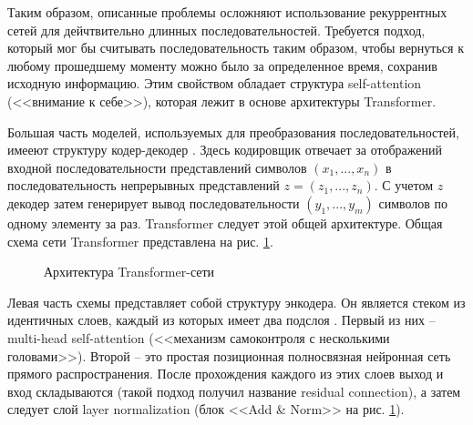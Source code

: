 \documentclass[14pt,a4paper]{extarticle}
\begin{document}
Таким образом, описанные проблемы осложняют использование рекуррентных сетей для дейчтвительно длинных последовательностей. Требуется подход, который мог бы считывать последовательность таким образом, чтобы вернуться к любому прошедшему моменту можно было за определенное время, сохранив исходную информацию. Этим свойством обладает структура self-attention (<<внимание к себе>>), которая лежит в основе архитектуры Transformer. 

Большая часть моделей, используемых для преобразования последовательностей, имееют структуру кодер-декодер \cite{cod_decod}. Здесь кодировщик отвечает за отображений входной последовательности представлений символов $(x_1, ..., x_n)$ в последовательность непрерывных представлений $z = (z_1,...,z_n)$. С учетом $z$ декодер затем генерирует вывод
последовательности $(y_1, ..., y_m)$ символов по одному элементу за раз. 
Transformer следует этой общей архитектуре. Общая схема сети Transformer представлена на рис. \ref{trans_arh_lbl}.
\begin{figure}[h]
\caption{Архитектура Transformer-сети}
\label{trans_arh_lbl}
\end{figure}  

Левая часть схемы представляет собой структуру энкодера. Он является стеком из идентичных слоев, каждый из которых имеет два подслоя \cite{transform}. Первый из них --  multi-head self-attention (<<механизм самоконтроля с несколькими головами>>). Второй -- это простая позиционная полносвязная нейронная сеть прямого распространения. После прохождения каждого из этих слоев выход и вход складываются (такой подход получил название residual connection), а затем следует слой layer normalization (блок <<Add \& Norm>> на рис. \ref{trans_arh_lbl}).
\end{document}
